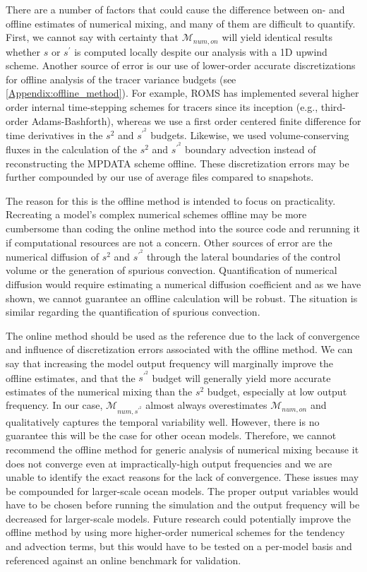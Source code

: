 There are a number of factors that could cause the difference between on- and offline estimates of numerical mixing, and many of them are difficult to quantify. First, we cannot say with certainty that $\mathcal{M}_{num, on}$ will yield identical results whether $s$ or $s^{\prime}$ is computed locally despite our analysis with a 1D upwind scheme. Another source of error is our use of lower-order accurate discretizations for offline analysis of the tracer variance budgets (see \ref{Appendix:offline_method}). For example, ROMS has implemented several higher order internal time-stepping schemes for tracers since its inception (e.g., third-order Adams-Bashforth), whereas we use a first order centered finite difference for time derivatives in the $s^2$ and $s^{\prime^2}$ budgets. Likewise, we used volume-conserving fluxes in the calculation of the $s^2$ and $s^{\prime^2}$ boundary advection instead of reconstructing the MPDATA scheme offline. These discretization errors may be further compounded by our use of average files compared to snapshots.

The reason for this is the offline method is intended to focus on practicality. Recreating a model's complex numerical schemes offline may be more cumbersome than coding the online method into the source code and rerunning it if computational resources are not a concern. Other sources of error are the numerical diffusion of $s^2$ and $s^{\prime^2}$ through the lateral boundaries of the control volume or the generation of spurious convection. Quantification of numerical diffusion would require estimating a numerical diffusion coefficient and as we have shown, we cannot guarantee an offline calculation will be robust. The situation is similar regarding the quantification of spurious convection. 

The online method should be used as the reference due to the lack of convergence and influence of discretization errors associated with the offline method. We can say that increasing the model output frequency will marginally improve the offline estimates, and that the $s^{\prime^2}$ budget will generally yield more accurate estimates of the numerical mixing than the $s^2$ budget, especially at low output frequency. In our case, $\mathcal{M}_{num, s^{\prime^2}}$ almost always overestimates $\mathcal{M}_{num, on}$ and qualitatively captures the temporal variability well. However, there is no guarantee this will be the case for other ocean models. Therefore, we cannot recommend the offline method for generic analysis of numerical mixing because it does not converge even at impractically-high output frequencies and we are unable to identify the exact reasons for the lack of convergence. These issues may be compounded for larger-scale ocean models. The proper output variables would have to be chosen before running the simulation and the output frequency will be decreased for larger-scale models. Future research could potentially improve the offline method by using more higher-order numerical schemes for the tendency and advection terms, but this would have to be tested on a per-model basis and referenced against an online benchmark for validation.

